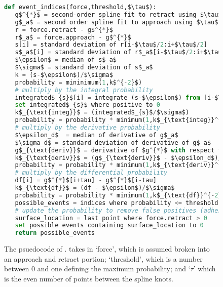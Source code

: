 \begin{figure}[htp]
\caption[\name{} psuedocode]{\noindent{}\pStartF The psuedocode of \name{}. \name{} takes in `force', which is assumed broken into an approach and retract portion; `threshold', which is a number between 0 and one defining the maximum probability; and `$\tau$' which is the even number of points between the spline knots. \pEndF }
  \begin{lstlisting}[language=Python]
def event_indices(force,threshold,$\tau$):
   g$^{*}$ = second-order spline fit to retract using $\tau$ for knots
   g$_a$ = second order spline fit to approach using $\tau$ for knots
   r = force.retract - g$^{*}$
   r$_a$ = force.approach - g$^{*}$
   s[i] = standard deviation of r[i-$\tau$/2:i+$\tau$/2]
   s$_a$[i] = standard deviation of r$_a$[i-$\tau$/2:i+$\tau$/2]
   $\epsilon$ = median of s$_a$
   $\sigma$ = standard deviation of s$_a$
   k = (s-$\epsilon$)/$\sigma$
   probability = mininimum(1,k$^{-2}$)
   # multiply by the integral probability 
   integrated$_{s}$[i] = integrate (s-$\epsilon$) from [i-$\tau$] to [i+$\tau$]
   set integrated$_{s}$ where positive to 0
   k$_{\text{integ}}$ = (integrated$_{s}$/$\sigma$)
   probability = probability * minimum(1,k$_{\text{integ}}^{-2}$)
   # multiply by the derivative probability
   $\epsilon_d$  = median of derivative of g$_a$
   $\sigma_d$ = standard deviation of derivative of g$_a$
   g$_{\text{deriv}}$ = derivative of $g^{*}$ with respect to time
   k$_{\text{deriv}}$ = (g$_{\text{deriv}}$ - $\epsilon_d$)/$\sigma_d$
   probability = probability * minimum(1,k$_{\text{deriv}}^{-2}$)
   # multiply by the differential probability 
   df[i] = g$^{*}$[i+tau] - g$^{*}$[i-tau]
   k$_{\text{df}}$ = (df - $\epsilon$)/$\sigma$
   probability = probability * minimum(1,k$_{\text{df}}^{-2}$)
   possible_events = indices where probability <= threshold
   # update the probability to remove false positives (adhesions)
   surface_location = last point where force.retract > 0
   set possible events containing surface_location to 0
   return possible_events
\end{lstlisting}
\end{figure}


